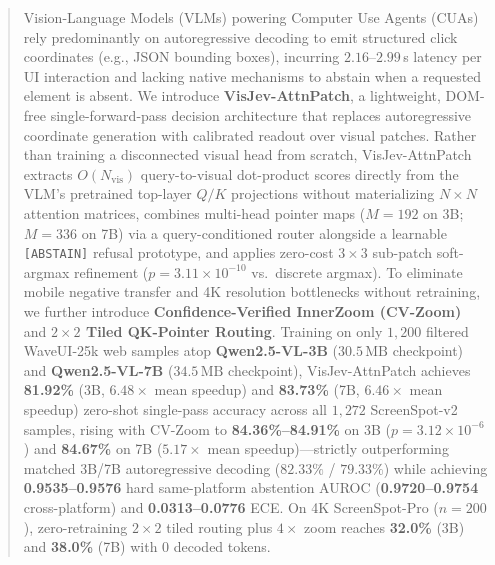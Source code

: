 \documentclass[10pt,twocolumn,letterpaper]{article}
\begin{document}
\maketitle

\begin{abstract}
\noindent Vision-Language Models (VLMs) powering Computer Use Agents (CUAs) rely predominantly on autoregressive decoding to emit structured click coordinates (e.g., JSON bounding boxes), incurring $2.16\text{--}2.99$\,s latency per UI interaction and lacking native mechanisms to abstain when a requested element is absent. We introduce \textbf{VisJev-AttnPatch}, a lightweight, DOM-free single-forward-pass decision architecture that replaces autoregressive coordinate generation with calibrated readout over visual patches. Rather than training a disconnected visual head from scratch, VisJev-AttnPatch extracts $O(N_{\mathrm{vis}})$ query-to-visual dot-product scores directly from the VLM's pretrained top-layer $Q/K$ projections without materializing $N{\times}N$ attention matrices, combines multi-head pointer maps ($M{=}192$ on 3B; $M{=}336$ on 7B) via a query-conditioned router alongside a learnable \texttt{[ABSTAIN]} refusal prototype, and applies zero-cost $3{\times}3$ sub-patch soft-argmax refinement ($p{=}3.11{\times}10^{-10}$ vs.\ discrete argmax). To eliminate mobile negative transfer and 4K resolution bottlenecks without retraining, we further introduce \textbf{Confidence-Verified InnerZoom (CV-Zoom)} and \textbf{$2{\times}2$ Tiled QK-Pointer Routing}. Training on only $1{,}200$ filtered WaveUI-25k web samples atop \textbf{Qwen2.5-VL-3B} ($30.5\,\text{MB}$ checkpoint) and \textbf{Qwen2.5-VL-7B} ($34.5\,\text{MB}$ checkpoint), VisJev-AttnPatch achieves \textbf{81.92\%} (3B, $6.48\times$ mean speedup) and \textbf{83.73\%} (7B, $6.46\times$ mean speedup) zero-shot single-pass accuracy across all $1{,}272$ ScreenSpot-v2 samples, rising with CV-Zoom to \textbf{84.36\%--84.91\%} on 3B ($p{=}3.12{\times}10^{-6}$) and \textbf{84.67\%} on 7B ($5.17\times$ mean speedup)---strictly outperforming matched 3B/7B autoregressive decoding ($82.33\%$ / $79.33\%$) while achieving \textbf{0.9535--0.9576} hard same-platform abstention AUROC (\textbf{0.9720--0.9754} cross-platform) and \textbf{0.0313--0.0776} ECE. On 4K ScreenSpot-Pro ($n{=}200$), zero-retraining $2{\times}2$ tiled routing plus $4{\times}$ zoom reaches \textbf{32.0\%} (3B) and \textbf{38.0\%} (7B) with $0$ decoded tokens.
\end{abstract}
\end{document}
